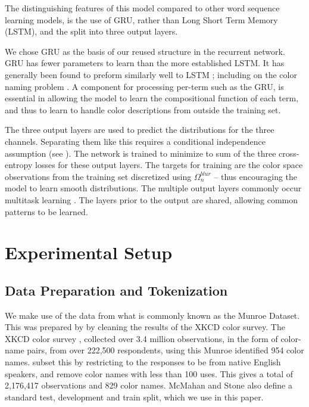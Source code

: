 \documentclass[11pt,letterpaper, twocolumn]{article}
\newcommand{\parencite}{\citep}
\newcommand{\textcite}{\cite}
\begin{document}
The distinguishing features of this model compared to other word sequence learning models, is the use of GRU, rather than Long Short Term Memory (LSTM), and the split into three output layers.


We chose GRU as the basis of our reused structure in the recurrent network.
GRU has fewer parameters to learn than the more established LSTM.
It has generally been found to preform similarly well to LSTM \parencite{chung2014empirical};
including on the color naming problem \parencite{2016arXiv160603821M}.
A component for processing per-term such as the GRU, is essential in allowing the model to learn the compositional function of each term,  and thus to learn to handle color descriptions from outside the training set.

The three output layers are used to predict the distributions for the three channels.
Separating them like this requires a conditional independence assumption (see ).
The network is trained to minimize to sum of the three cross-entropy losses for these output layers.
The targets for training are the color space observations from the training set discretized using $\Omega_n^{blur}$ -- thus encouraging the model to learn smooth distributions.
The multiple output layers commonly occur multitask learning \parencite{caruana1997multitask,collobert2008unified}.
The layers prior to the output are shared, allowing common patterns to be learned.


\section{Experimental Setup}\label{sec:experimental-setup}
\subsection{Data Preparation and Tokenization}\label{sec:data-preparation}
We make use of the data from what is commonly known as the Munroe Dataset.
This was prepared by \textcite{mcmahan2015bayesian} by cleaning the results of the XKCD color survey.
The XKCD color survey \parencite{Munroe2010XKCDdataset}, collected over 3.4 million observations, in the form of color-name pairs, from over 222,500 respondents, using this Munroe identified 954 color names.
\textcite{mcmahan2015bayesian} subset this by restricting to the responses to be from native English speakers, 
and remove color names with less than 100 uses.
This gives a total of 2,176,417 observations and 829 color names. 
McMahan and Stone also define a standard test, development and train split, which we use in this paper.
\end{document}
